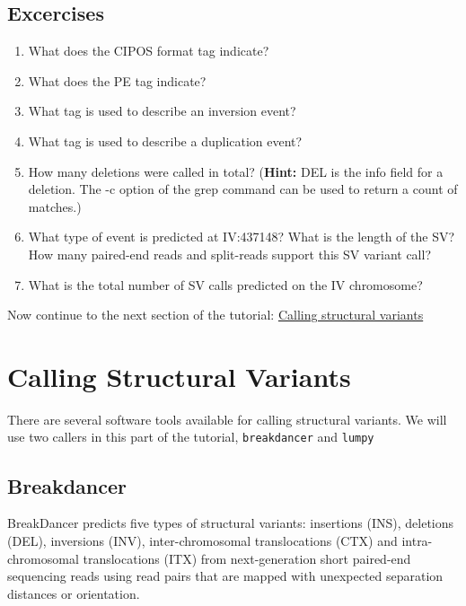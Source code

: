 \documentclass[11pt]{article}
\providecommand{\tightlist}{%
      \setlength{\itemsep}{0pt}\setlength{\parskip}{0pt}}
\begin{document}
    \hypertarget{excercises}{%
\subsection{Excercises}\label{excercises}}

\begin{enumerate}
\def\labelenumi{\arabic{enumi}.}
\tightlist
\item
  What does the CIPOS format tag indicate?
\item
  What does the PE tag indicate?
\item
  What tag is used to describe an inversion event?
\item
  What tag is used to describe a duplication event?
\item
  How many deletions were called in total? (\textbf{Hint:} DEL is the
  info field for a deletion. The -c option of the grep command can be
  used to return a count of matches.)
\item
  What type of event is predicted at IV:437148? What is the length of
  the SV? How many paired-end reads and split-reads support this SV
  variant call?
\item
  What is the total number of SV calls predicted on the IV chromosome?
\end{enumerate}

    Now continue to the next section of the tutorial:
\href{sv-calling.ipynb}{Calling structural variants}





\newpage





    \hypertarget{calling-structural-variants}{%
\section{Calling Structural
Variants}\label{calling-structural-variants}}

There are several software tools available for calling structural
variants. We will use two callers in this part of the tutorial,
\texttt{breakdancer} and \texttt{lumpy}

\hypertarget{breakdancer}{%
\subsection{Breakdancer}\label{breakdancer}}

BreakDancer predicts five types of structural variants: insertions
(INS), deletions (DEL), inversions (INV), inter-chromosomal
translocations (CTX) and intra-chromosomal translocations (ITX) from
next-generation short paired-end sequencing reads using read pairs that
are mapped with unexpected separation distances or orientation.
\end{document}
